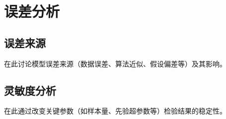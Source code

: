 \section{误差分析}

\subsection{误差来源}
在此讨论模型误差来源（数据误差、算法近似、假设偏差等）及其影响。

\subsection{灵敏度分析}
在此通过改变关键参数（如样本量、先验超参数等）检验结果的稳定性。
